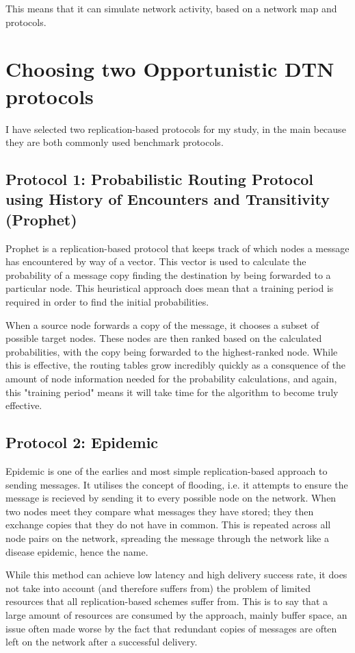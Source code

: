\documentclass[12pt]{report}
\begin{document}
This means that it can simulate network activity, based on a network map and protocols.

\section{Choosing two Opportunistic DTN protocols}
I have selected two replication-based protocols for my study, in the main because they are both commonly used benchmark protocols.

\subsection{Protocol 1: Probabilistic Routing Protocol using History of Encounters and Transitivity (Prophet)}
Prophet is a replication-based protocol that keeps track of which nodes a message has encountered by way of a vector.
This vector is used to calculate the probability of a message copy finding the destination by being forwarded to a particular node.
This heuristical approach does mean that a training period is required in order to find the initial probabilities.
\par
When a source node forwards a copy of the message, it chooses a subset of possible target nodes.
These nodes are then ranked based on the calculated probabilities, with the copy being forwarded to the highest-ranked node.\cite{prophetreport1}
While this is effective, the routing tables grow incredibly quickly as a consquence of the amount of node information needed for the probability calculations, and again, this "training period" means it will take time for the algorithm to become truly effective.

\subsection{Protocol 2: Epidemic}
Epidemic\cite{epidemicreport} is one of the earlies and most simple replication-based approach to sending messages.
It utilises the concept of flooding, i.e. it attempts to ensure the message is recieved by sending it to every possible node on the network.
When two nodes meet they compare what messages they have stored; they then exchange copies that they do not have in common.
This is repeated across all node pairs on the network, spreading the message through the network like a disease epidemic, hence the name.
\par
While this method can achieve low latency and high delivery success rate, it does not take into account (and therefore suffers from) the problem of limited resources that all replication-based schemes suffer from.
This is to say that a large amount of resources are consumed by the approach, mainly buffer space, an issue often made worse by the fact that redundant copies of messages are often left on the network after a successful delivery.
\end{document}
